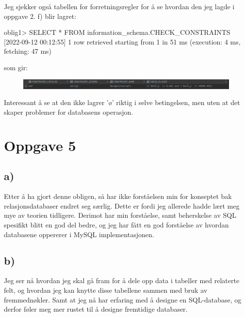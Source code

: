 \documentclass[%
notitlepage,
 amsmath,amssymb,
 aps,
rmp,
]{revtex4-2}  %
\begin{document}
Jeg sjekker også tabellen for forretningsregler for å se hvordan den jeg lagde i oppgave 2. f) blir lagret:
\begin{sql}
oblig1> SELECT *
        FROM information_schema.CHECK_CONSTRAINTS
[2022-09-12 00:12:55] 1 row retrieved starting from 1 in 51 ms (execution: 4 ms, fetching: 47 ms)
\end{sql}
som gir:
\begin{figure}[H]
\centering\includegraphics[width=\columnwidth]{op4c2.png}
\end{figure}
Interessant å se at den ikke lagrer 'ø' riktig i selve betingelsen, men uten at det skaper problemer for databasens operasjon.

\section*{Oppgave 5}
\subsection*{a)}
Etter å ha gjort denne obligen, så har ikke forståelsen min for konseptet bak relasjonsdatabaser endret seg særlig. Dette er fordi jeg allerede hadde lært meg mye av teorien tidligere. Derimot har min forståelse, samt beherskelse av SQL spesifikt blitt en god del bedre, og jeg har fått en god forståelse av hvordan databasene oppererer i MySQL implementasjonen.

\subsection*{b)}
Jeg ser nå hvordan jeg skal gå fram for å dele opp data i tabeller med relaterte felt, og hvordan jeg kan knytte disse tabellene sammen med bruk av fremmednøkler. Samt at jeg nå har erfaring med å designe en SQL-database, og derfor føler meg mer rustet til å designe fremtidige databaser.
\end{document}
